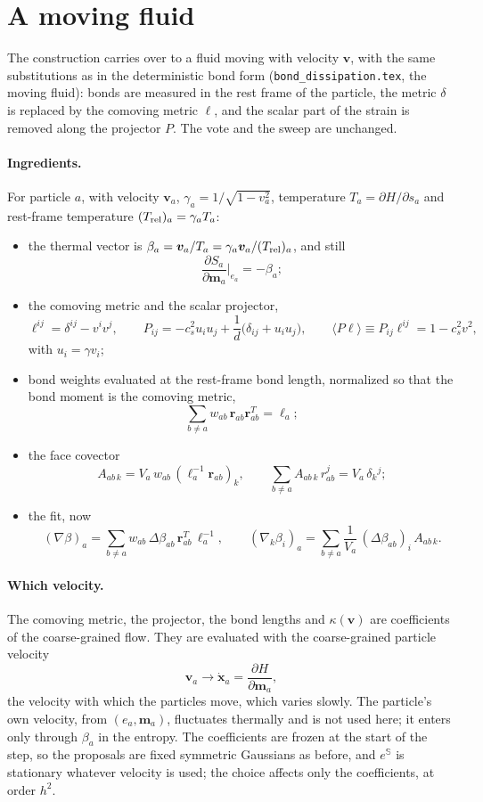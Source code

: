 \documentclass[11pt,aps,preprint,nofootinbib,superscriptaddress,tightenlines]{revtex4-2}
\def\st{\begin{equation}}
\def\stp{\end{equation}}
\newcommand{\avg}[1]{\langle #1\rangle}
\let\oldparagraph\paragraph
\renewcommand{\paragraph}{\par\bigskip\oldparagraph}
\begin{document}
\section{A moving fluid}
\label{sec:moving}

The construction carries over to a fluid moving with velocity $\bm v$, with
the same substitutions as in the deterministic bond form
(\texttt{bond\_dissipation.tex}, the moving fluid): bonds are measured in the
rest frame of the particle, the metric $\delta$ is replaced by the comoving
metric $\ell$, and the scalar part of the strain is removed along the projector
$P$.  The vote and the sweep are unchanged.

\paragraph{Ingredients.}  For particle $a$, with velocity $\bm v_a$,
$\gamma_a=1/\sqrt{1-v_a^2}$, temperature $T_a=\partial H/\partial s_a$ and rest-frame
temperature $(T_{\rm rel})_a=\gamma_aT_a$:
\begin{itemize}
\item the thermal vector is $\beta_a=\bm v_a/T_a=\gamma_a\bm v_a/(T_{\rm rel})_a$, and still
  \st
  \frac{\partial S_a}{\partial\bm m_a}\Big|_{e_a}=-\beta_a ;
  \stp
\item the comoving metric and the scalar projector,
  \st
  \ell^{ij}=\delta^{ij}-v^iv^j,\qquad
  P_{ij}=-c_s^2u_iu_j+\frac1d\big(\delta_{ij}+u_iu_j\big),\qquad
  \avg{P\ell}\equiv P_{ij}\ell^{ij}=1-c_s^2v^2 ,
  \stp
  with $u_i=\gamma v_i$;
\item bond weights evaluated at the rest-frame bond length, normalized so that
  the bond moment is the comoving metric,
  \st
  \sum_{b\neq a}w_{ab}\,\bm r_{ab}\bm r_{ab}^T=\ell_a ;
  \stp
\item the face covector
  \st
  A_{ab\,k}=V_a\,w_{ab}\,(\ell_a^{-1}\bm r_{ab})_k ,
  \qquad \sum_{b\neq a}A_{ab\,k}\,r^j_{ab}=V_a\,\delta_k{}^j ;
  \label{Amoving}
  \stp
\item the fit, now
  \st
  (\nabla\beta)_a=\sum_{b\neq a}w_{ab}\,\Delta\beta_{ab}\,\bm r_{ab}^T\,\ell_a^{-1},\qquad
  (\nabla_k\beta_i)_a=\sum_{b\neq a}\frac{1}{V_a}\,(\Delta\beta_{ab})_i\,A_{ab\,k} .
  \label{Gmoving}
  \stp
\end{itemize}
\paragraph{Which velocity.}  The comoving metric, the projector, the bond lengths
and $\kappa(\bm v)$ are coefficients of the coarse-grained flow.  They are evaluated
with the coarse-grained particle velocity
\st
\bm v_a\to\dot{\bm x}_a=\frac{\partial H}{\partial\bm m_a},
\stp
the velocity with which the particles move, which varies slowly.  The
particle's own velocity, from $(e_a,\bm m_a)$, fluctuates thermally and is not
used here; it enters only through $\beta_a$ in the entropy.  The coefficients
are frozen at the start of the step, so the proposals are fixed symmetric
Gaussians as before, and $e^{\mathbb S}$ is stationary whatever velocity is used;
the choice affects only the coefficients, at order $h^2$.
\end{document}
